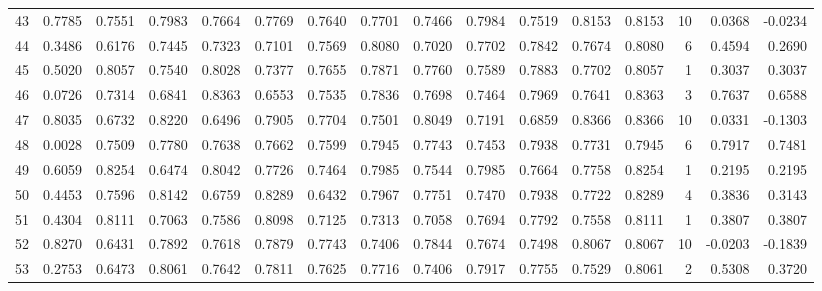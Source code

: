 \begin{tabular}{lrrrrrrrrrrrrrrr}
43  &      0.7785 &  0.7551 &  0.7983 &  0.7664 &  0.7769 &  0.7640 &  0.7701 &  0.7466 &  0.7984 &  0.7519 &   0.8153 &     0.8153 &     10 &                    0.0368 &                    -0.0234 \\
44  &      0.3486 &  0.6176 &  0.7445 &  0.7323 &  0.7101 &  0.7569 &  0.8080 &  0.7020 &  0.7702 &  0.7842 &   0.7674 &     0.8080 &      6 &                    0.4594 &                     0.2690 \\
45  &      0.5020 &  0.8057 &  0.7540 &  0.8028 &  0.7377 &  0.7655 &  0.7871 &  0.7760 &  0.7589 &  0.7883 &   0.7702 &     0.8057 &      1 &                    0.3037 &                     0.3037 \\
46  &      0.0726 &  0.7314 &  0.6841 &  0.8363 &  0.6553 &  0.7535 &  0.7836 &  0.7698 &  0.7464 &  0.7969 &   0.7641 &     0.8363 &      3 &                    0.7637 &                     0.6588 \\
47  &      0.8035 &  0.6732 &  0.8220 &  0.6496 &  0.7905 &  0.7704 &  0.7501 &  0.8049 &  0.7191 &  0.6859 &   0.8366 &     0.8366 &     10 &                    0.0331 &                    -0.1303 \\
48  &      0.0028 &  0.7509 &  0.7780 &  0.7638 &  0.7662 &  0.7599 &  0.7945 &  0.7743 &  0.7453 &  0.7938 &   0.7731 &     0.7945 &      6 &                    0.7917 &                     0.7481 \\
49  &      0.6059 &  0.8254 &  0.6474 &  0.8042 &  0.7726 &  0.7464 &  0.7985 &  0.7544 &  0.7985 &  0.7664 &   0.7758 &     0.8254 &      1 &                    0.2195 &                     0.2195 \\
50  &      0.4453 &  0.7596 &  0.8142 &  0.6759 &  0.8289 &  0.6432 &  0.7967 &  0.7751 &  0.7470 &  0.7938 &   0.7722 &     0.8289 &      4 &                    0.3836 &                     0.3143 \\
51  &      0.4304 &  0.8111 &  0.7063 &  0.7586 &  0.8098 &  0.7125 &  0.7313 &  0.7058 &  0.7694 &  0.7792 &   0.7558 &     0.8111 &      1 &                    0.3807 &                     0.3807 \\
52  &      0.8270 &  0.6431 &  0.7892 &  0.7618 &  0.7879 &  0.7743 &  0.7406 &  0.7844 &  0.7674 &  0.7498 &   0.8067 &     0.8067 &     10 &                   -0.0203 &                    -0.1839 \\
53  &      0.2753 &  0.6473 &  0.8061 &  0.7642 &  0.7811 &  0.7625 &  0.7716 &  0.7406 &  0.7917 &  0.7755 &   0.7529 &     0.8061 &      2 &                    0.5308 &                     0.3720 \\

\end{tabular}
